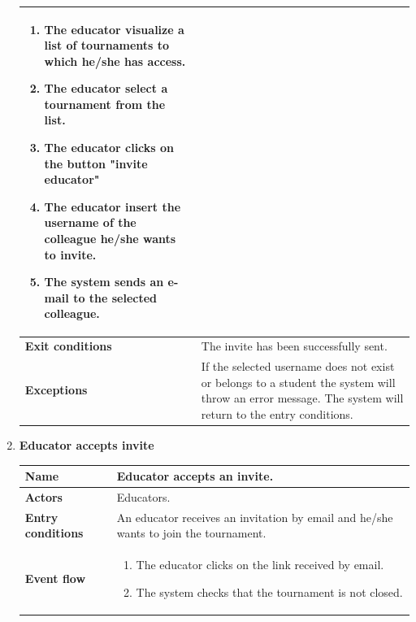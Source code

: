 \begin{enumerate}[label=\textbf{UC.\arabic*}]
\begin{table}[H]
\begin{tabular}{|m{3.2cm}|m{9.8cm}|}
\begin{enumerate}[label=\arabic*.]
                        \item The educator visualize a list of tournaments to which he/she has access.
                        \item The educator select a tournament from the list.
                        \item The educator clicks on the button "invite educator"
                        \item The educator insert the username of the colleague he/she wants to invite.
                        \item The system sends an e-mail to the selected colleague.
                    \end{enumerate}\\
                    \hline
                    \textbf{Exit conditions}  & The invite has been successfully sent. \\
                    \hline
                    \textbf{Exceptions} & If the selected username does not exist or belongs to a student the system will throw an error message. The system will return to the entry conditions.
                \end{tabular}
        \end{table}
        \item {} \textbf{Educator accepts invite}
        \begin{table}[H]
    	    \centering
                \renewcommand{\arraystretch}{1.5}
                \begin{tabular}{|m{3.2cm}|m{9.8cm}|}
                    \hline
                    \textbf{Name} & Educator accepts an invite. \\
                    \hline
                    \textbf{Actors} & Educators. \\
                    \hline
                    \textbf{Entry conditions}  & An educator receives an invitation by email and he/she wants to join the tournament. \\
                    \hline
                    \textbf{Event flow}  & 
                    \begin{enumerate}[label=\arabic*.]
                        \item The educator clicks on the link received by email.
                        \item The system checks that the tournament is not closed.
                    \end{enumerate}\\ 
                    \hline

\end{tabular}
\end{table}
\end{enumerate}

